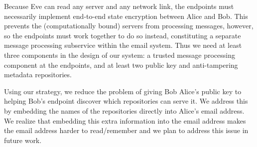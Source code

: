 Because Eve can read any server and any network link, the endpoints 
must necessarily implement end-to-end state encryption between Alice 
and Bob.  This prevents the (computationally bound) servers from 
processing messages, however, so the endpoints must work together 
to do so instead, constituting a separate message processing subservice 
within the email system.  Thus we need at least three components in the 
design of our system: a trusted message processing component at the 
endpoints, and at least two public key and anti-tampering metadata 
repositories.

Using our strategy, we reduce the problem of giving Bob Alice’s public 
key to helping Bob’s endpoint discover which repositories can serve it.  
We address this by embedding the names of the repositories directly into 
Alice’s email address. We realize that embedding this extra information 
into the email address makes the email address harder to read/remember 
and we plan to address this issue in future work. 
